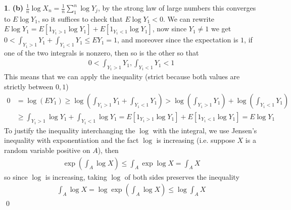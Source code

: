 \documentclass{article}
\theoremstyle{definition}
\newtheorem{pb}{}
\begin{document}
\begin{pb}
    \textbf{(b)} \(\frac{1}{n}\log X_n = \frac{1}{n} \sum_1^n \log Y_j\), by the strong law of large numbers this converges to \(E\log Y_1\), so it suffices to check that \(E \log Y_1 < 0\). We can rewrite \(E \log Y_1 = E[1_{Y_1 > 1}\log Y_1] + E[1_{Y_1 < 1}\log Y_1]\), now since \(Y_1 \neq 1\) we get \(0 < \int_{Y_1 > 1}Y_1 + \int_{Y_1 < 1}Y_1 \leq EY_1 = 1\), and moreover since the expectation is \(1\), if one of the two integrals is nonzero, then so is the other so that
    \begin{align*}
        0 < \int_{Y_1 > 1}Y_1, \int_{Y_1 < 1}Y_1 < 1
    \end{align*}
    This means that we can apply the inequality (strict because both values are strictly between \(0,1\))
    \begin{align*}
        0 &= \log(EY_1) \geq \log\left(\int_{Y_1 > 1}Y_1 + \int_{Y_1 < 1}Y_1\right) > \log\left(\int_{Y_1 > 1}Y_1\right) + \log\left(\int_{Y_1 < 1}Y_1\right) \\
        &\geq \int_{Y_1>1}\log Y_1 + \int_{Y_1 < 1} \log Y_1 = E[1_{Y_1 > 1}\log Y_1] + E[1_{Y_1 < 1}\log Y_1] = E \log Y_1
    \end{align*}
    To justify the inequality interchanging the \(\log\) with the integral, we use Jensen's inequality with exponentiation and the fact \(\log\) is increasing (i.e. suppose \(X\) is a random variable positive on \(A\)), then
    \begin{align*}
        \exp\left(\int_A \log X\right) \leq \int_A \exp\log X = \int_A X
    \end{align*}
    so since \(\log\) is increasing, taking \(\log\) of both sides preserves the inequality
    \begin{align*}
        \int_A \log X = \log \exp\left(\int_A \log X\right) \leq \log \int_A X
    \end{align*} \qed
    \end{pb}
\end{document}
